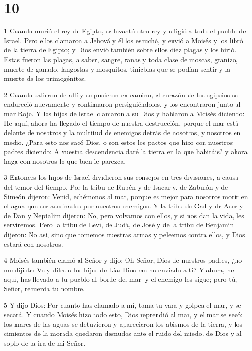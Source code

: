 \chapter{10}

\par 1 Cuando murió el rey de Egipto, se levantó otro rey y afligió a todo el pueblo de Israel. Pero ellos clamaron a Jehová y él los escuchó, y envió a Moisés y los libró de la tierra de Egipto; y Dios envió también sobre ellos diez plagas y los hirió. Estas fueron las plagas, a saber, sangre, ranas y toda clase de moscas, granizo, muerte de ganado, langostas y mosquitos, tinieblas que se podían sentir y la muerte de los primogénitos.

\par 2 Cuando salieron de allí y se pusieron en camino, el corazón de los egipcios se endureció nuevamente y continuaron persiguiéndolos, y los encontraron junto al mar Rojo. Y los hijos de Israel clamaron a su Dios y hablaron a Moisés diciendo: He aquí, ahora ha llegado el tiempo de nuestra destrucción, porque el mar está delante de nosotros y la multitud de enemigos detrás de nosotros, y nosotros en medio. ¿Para esto nos sacó Dios, o son estos los pactos que hizo con nuestros padres diciendo: A vuestra descendencia daré la tierra en la que habitáis? y ahora haga con nosotros lo que bien le parezca.

\par 3 Entonces los hijos de Israel dividieron sus consejos en tres divisiones, a causa del temor del tiempo. Por la tribu de Rubén y de Isacar y. de Zabulón y de Simeón dijeron: Venid, echémonos al mar, porque es mejor para nosotros morir en el agua que ser asesinados por nuestros enemigos. Y la tribu de Gad y de Aser y de Dan y Neptalim dijeron: No, pero volvamos con ellos, y si nos dan la vida, les serviremos. Pero la tribu de Leví, de Judá, de José y de la tribu de Benjamín dijeron: No así, sino que tomemos nuestras armas y peleemos contra ellos, y Dios estará con nosotros.

\par 4 Moisés también clamó al Señor y dijo: Oh Señor, Dios de nuestros padres, ¿no me dijiste: Ve y diles a los hijos de Lía: Dios me ha enviado a ti? Y ahora, he aquí, has llevado a tu pueblo al borde del mar, y el enemigo los sigue; pero tú, Señor, recuerda tu nombre.

\par 5 Y dijo Dios: Por cuanto has clamado a mí, toma tu vara y golpea el mar, y se secará. Y cuando Moisés hizo todo esto, Dios reprendió al mar, y el mar se secó: los mares de las aguas se detuvieron y aparecieron los abismos de la tierra, y los cimientos de la morada quedaron desnudos ante el ruido del miedo. de Dios y al soplo de la ira de mi Señor.

